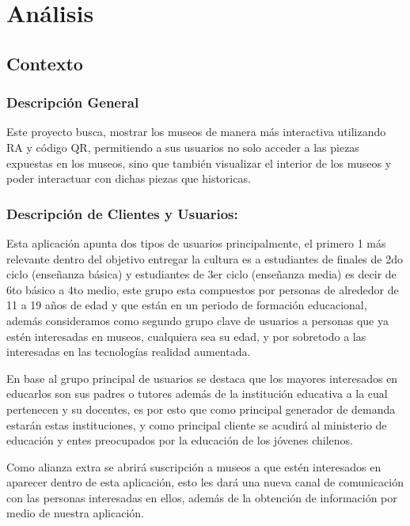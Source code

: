 \section{Análisis}

\subsection{Contexto}

\subsubsection{Descripción General}

Este proyecto busca, mostrar los museos de manera más interactiva utilizando RA y código QR, permitiendo a sus usuarios no solo acceder a las piezas expuestas en los museos, sino que también visualizar el interior de los museos y poder interactuar con dichas piezas que historicas.


\subsubsection{Descripción de Clientes y Usuarios:}

Esta aplicación apunta dos tipos de usuarios principalmente, el primero 1 más relevante dentro del objetivo entregar la cultura es a estudiantes de finales de 2do ciclo (enseñanza básica) y estudiantes de 3er ciclo (enseñanza media) es decir de 6to básico a 4to medio, este grupo esta compuestos por personas de alrededor de 11 a 19 años de edad y que están en un periodo de formación educacional, además consideramos como segundo grupo clave de usuarios a personas que ya estén interesadas en museos, cualquiera sea su edad, y por sobretodo a las interesadas en las tecnologías realidad aumentada.

En base al grupo principal de usuarios se destaca que los mayores interesados en educarlos son sus padres o tutores además de la institución educativa a la cual pertenecen y su docentes, es por esto que como principal generador de demanda estarán estas instituciones, y como principal cliente se acudirá al ministerio de educación y entes preocupados por la educación de los jóvenes chilenos.

Como alianza extra se abrirá suscripción a museos a que estén interesados en aparecer dentro de esta aplicación, esto les dará una nueva canal de comunicación con las personas interesadas en ellos, además de la obtención de información por medio de nuestra aplicación.


